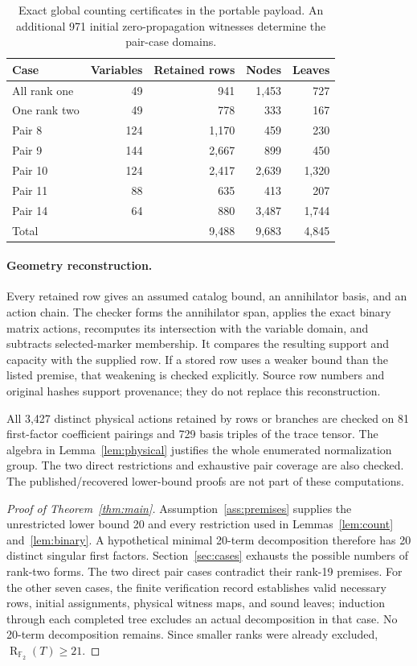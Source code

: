\documentclass[11pt]{article}
\newcommand{\F}{\mathbb F_2}
\newcommand{\R}{\operatorname{R}_{\F}}
\theoremstyle{definition}
\begin{document}
\begin{table}[ht]
\centering
\begin{tabular}{lrrrr}
\toprule
Case & Variables & Retained rows & Nodes & Leaves \\
\midrule
All rank one & 49 & 941 & 1,453 & 727 \\
One rank two & 49 & 778 & 333 & 167 \\
Pair 8 & 124 & 1,170 & 459 & 230 \\
Pair 9 & 144 & 2,667 & 899 & 450 \\
Pair 10 & 124 & 2,417 & 2,639 & 1,320 \\
Pair 11 & 88 & 635 & 413 & 207 \\
Pair 14 & 64 & 880 & 3,487 & 1,744 \\
\midrule
Total & & 9,488 & 9,683 & 4,845 \\
\bottomrule
\end{tabular}
\caption{Exact global counting certificates in the portable payload. An additional 971 initial zero-propagation witnesses determine the pair-case domains.}
\label{tab:certificates}
\end{table}

\paragraph{Geometry reconstruction.}
Every retained row gives an assumed catalog bound, an annihilator basis, and an action chain. The checker forms the annihilator span, applies the exact binary matrix actions, recomputes its intersection with the variable domain, and subtracts selected-marker membership. It compares the resulting support and capacity with the supplied row. If a stored row uses a weaker bound than the listed premise, that weakening is checked explicitly. Source row numbers and original hashes support provenance; they do not replace this reconstruction.

All 3,427 distinct physical actions retained by rows or branches are checked on 81 first-factor coefficient pairings and 729 basis triples of the trace tensor. The algebra in Lemma~\ref{lem:physical} justifies the whole enumerated normalization group. The two direct restrictions and exhaustive pair coverage are also checked. The published/recovered lower-bound proofs are not part of these computations.

\begin{proof}[Proof of Theorem~\ref{thm:main}]
Assumption~\ref{ass:premises} supplies the unrestricted lower bound 20 and every restriction used in Lemmas~\ref{lem:count} and~\ref{lem:binary}. A hypothetical minimal 20-term decomposition therefore has 20 distinct singular first factors. Section~\ref{sec:cases} exhausts the possible numbers of rank-two forms. The two direct pair cases contradict their rank-19 premises. For the other seven cases, the finite verification record establishes valid necessary rows, initial assignments, physical witness maps, and sound leaves; induction through each completed tree excludes an actual decomposition in that case. No 20-term decomposition remains. Since smaller ranks were already excluded, $\R(T)\geq21$.
\end{proof}
\end{document}
